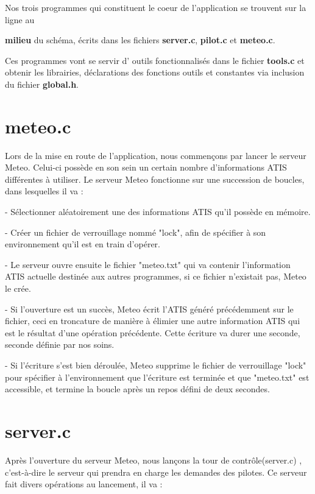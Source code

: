 \documentclass{report}
\begin{document}
	Nos trois programmes qui constituent le coeur de l'application se trouvent sur la ligne au {\textbf{milieu} du schéma, écrits dans les fichiers {\textbf{\color{red} server.c}}, {      \textbf{\color{red} pilot.c}} et {\textbf{\color{red} meteo.c}}.

 Ces programmes vont se servir d' \og outils \fg fonctionnalisés dans le fichier {\textbf{\color{red} tools.c}} et obtenir les librairies, déclarations des fonctions outils et constantes  via inclusion du fichier {\textbf{\color{black} global.h}}.

\section{meteo.c}

	Lors de la mise en route de l'application, nous commençons par lancer le serveur Meteo.
	Celui-ci possède en son sein un certain nombre d'informations ATIS différentes à utiliser.
	Le serveur Meteo fonctionne sur une succession de boucles, dans lesquelles il va :

	- Sélectionner aléatoirement une des informations ATIS qu'il possède en mémoire.

	- Créer un fichier de verrouillage nommé "lock", afin de spécifier à son environnement qu'il est en train d'opérer.

	- Le serveur ouvre ensuite le fichier "meteo.txt" qui va contenir l'information ATIS actuelle destinée aux autres programmes, si ce fichier n'existait pas, Meteo le crée.

	- Si l'ouverture est un succès, Meteo écrit l'ATIS généré précédemment sur le fichier, ceci en troncature de manière à élimier une autre information ATIS qui est le résultat d'une opération précédente. Cette écriture va durer une seconde, seconde définie par nos soins.

	- Si l'écriture s'est bien déroulée, Meteo supprime le fichier de verrouillage "lock" pour spécifier à l'environnement que l'écriture est terminée et que "meteo.txt" est accessible, et termine la boucle après un repos défini de deux secondes.

	\section{server.c}

Après l'ouverture du serveur Meteo, nous lançons la tour de contrôle(server.c) , c'est-à-dire le serveur qui prendra en charge les demandes des pilotes.
Ce serveur fait divers opérations au lancement, il va : 

}
\end{document}
